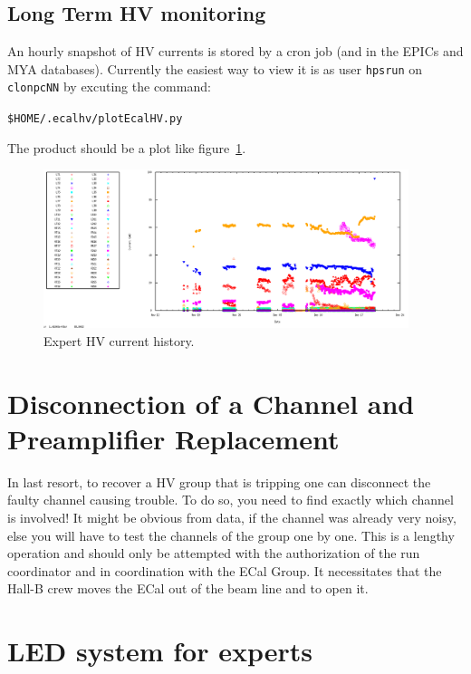 \documentclass[12pt]{article}
\begin{document}
{   \subsection{Long Term HV monitoring}

   An hourly snapshot of HV currents is stored by a cron job (and in the EPICs and MYA databases).  Currently the easiest way to view it is as user \texttt{hpsrun} on \texttt{clonpcNN} by excuting the command:
   \begin{center}
   \texttt{\$HOME/.ecalhv/plotEcalHV.py}
   \end{center}
The product should be a plot like figure~\ref{HVhistory}.

\begin{figure}[htbp]
\center
\includegraphics[width=0.95\textwidth]{pics/ECALHVCURRENTS_2014_12_20.png}
\caption{\small \label{HVhistory} Expert HV current history.}
\end{figure}

   \section{Disconnection of a Channel and Preamplifier Replacement}
     
      In last resort, to recover a HV group that is tripping one can disconnect the faulty channel causing trouble. To do so, you need to find exactly which channel is involved! It might be obvious from data, if the channel was already very noisy, else you will have to test the channels of the group one by one. This is a lengthy operation and should only be attempted with the authorization of the run coordinator and in coordination with the ECal Group. It necessitates that the Hall-B crew moves the ECal out of the beam line and to open it.

   \section{LED system for experts}

}
\end{document}
